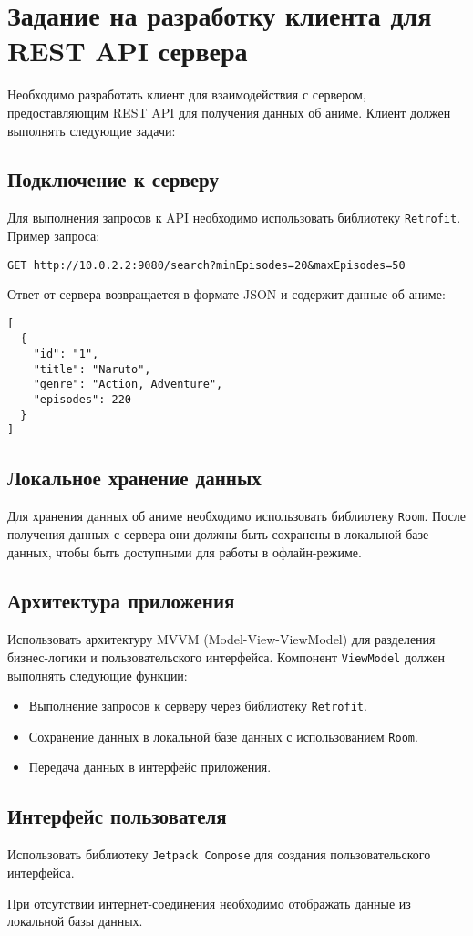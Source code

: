 \section{Задание на разработку клиента для REST API сервера}

Необходимо разработать клиент для взаимодействия с сервером, предоставляющим REST API для получения данных об аниме. Клиент должен выполнять следующие задачи:

\subsection{Подключение к серверу}

Для выполнения запросов к API необходимо использовать библиотеку \texttt{Retrofit}. Пример запроса:

\begin{verbatim}
GET http://10.0.2.2:9080/search?minEpisodes=20&maxEpisodes=50
\end{verbatim}

Ответ от сервера возвращается в формате JSON и содержит данные об аниме:

\begin{verbatim}
[
  {
    "id": "1",
    "title": "Naruto",
    "genre": "Action, Adventure",
    "episodes": 220
  }
]
\end{verbatim}

\subsection{Локальное хранение данных}
Для хранения данных об аниме необходимо использовать библиотеку \texttt{Room}. После получения данных с сервера они должны быть сохранены в локальной базе данных, чтобы быть доступными для работы в офлайн-режиме.

\subsection{Архитектура приложения}
Использовать архитектуру MVVM (Model-View-ViewModel) для разделения бизнес-логики и пользовательского интерфейса. Компонент \texttt{ViewModel} должен выполнять следующие функции:
\begin{itemize}
    \item Выполнение запросов к серверу через библиотеку \texttt{Retrofit}.
    \item Сохранение данных в локальной базе данных с использованием \texttt{Room}.
    \item Передача данных в интерфейс приложения.
\end{itemize}

\subsection{Интерфейс пользователя}
Использовать библиотеку \texttt{Jetpack Compose} для создания пользовательского интерфейса.


При отсутствии интернет-соединения необходимо отображать данные из локальной базы данных.
